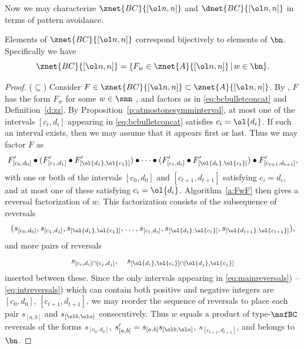 Now we may characterize $\znet{BC}{[\ol n, n]}$ and $\dnet{BC}{[\ol n, n]}$
in terms of pattern avoidance.

\begin{thm}\label{t:znetbcpavoid}
  Elements of $\znet{BC}{[\ol n,n]}$ correspond bijectively to
  \pavoiding elements of $\bn$.  Specifically we have
  \begin{equation}\label{eq:znetbcseteq}
    \znet{BC}{[\ol n, n]} =
    \{ F_w \in \znet{A}{[\ol n,n]} \,|\, w \in \bn \}.
    \end{equation}
\end{thm}
\begin{proof}
  ($\subseteq$)
  Consider $F \in \znet{BC}{[\ol n,n]} \subset \znet{A}{[\ol n,n]}$.
  By \cite[\S 3]{SkanNNDCB}, $F$ has the form $F_w$
  for some $w \in \snn$ \avoidingp, and factors as in
  \eqref{eq:bcbulletconcat}
  and Definition~\ref{d:zz}.
  By Proposition~\ref{p:atmostonesymminterval},
  at most one of the intervals $[c_i,d_i]$ appearing in
  \eqref{eq:bcbulletconcat} satisfies $c_i = \ol{d_i}$.
  If such an interval exists, then we may assume that it appears
  first or last.
  Thus we may factor $F$ as
  \begin{equation*}
    F'_{[c_0,d_0]} \bullet
    (F'_{[c_1,d_1]} \bullet F'_{[\ol{d_1},\ol{c_1}]}) \bullet \cdots \bullet
    (F'_{[c_t,d_t]} \bullet F'_{[\ol{d_t},\ol{c_t}]})
    \bullet F'_{[c_{t+1},d_{t+1}]},
  \end{equation*}
  with one or both of the intervals $[c_0,d_0]$ and $[c_{t+1},d_{t+1}]$
  satisfying $c_i=d_i$, and at most one of these satisfying $c_i = \ol{d_i}$.
  Algorithm~\ref{a:FwF}
  then gives a reversal factorization of $w$.
  This factorization consists of the subsequence of reversals
  \begin{equation}\label{eq:mainreversals}
    (s_{[c_0,d_0]}, s_{[c_1,d_1]}, s_{[\ol{d_1},\ol{c_1}]}, \dotsc,
    s_{[c_t,d_t]}, s_{[\ol{d_t},\ol{c_t}]}, s_{[\ol{d_{t+1}},\ol{c_{t+1}}]}),
  \end{equation}
  and more pairs of reversals 
  \begin{equation}\label{eq:intreversals}
    s_{[c_i,d_i] \cap [c_j,d_j]}, \quad  s_{[\ol{d_i},\ol{c_i}] \cap [\ol{d_j},\ol{c_j}]}
  \end{equation}
  inserted between these.
  Since the only intervals appearing in
  \eqref{eq:mainreversals}) -- \eqref{eq:intreversals})  
  which can contain both positive and negative integers
  are $[c_0,d_0]$, $[c_{t+1},d_{t+1}]$,
  we may reorder the sequence of reversals
  to place each pair $s_{[a,b]}$ and $s_{[\ol b, \ol a]}$ consecutively.
  Thus $w$ equals a product of type-$\msfBC$ reversals of the
  forms $s_{[c_0,d_0]}$, $s'_{[a,b]} = s_{[a,b]}s_{[\ol b, \ol a]}$,
  $s_{[c_{t+1},d_{t+1}]}$, and belongs to $\bn$.


\end{proof}
